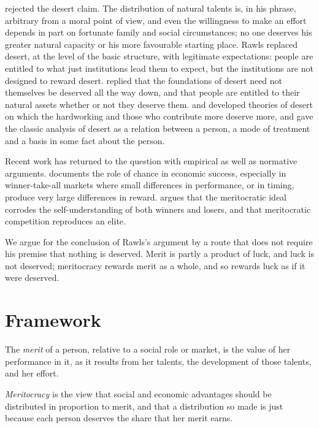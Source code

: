 \documentclass{situationist-preprint}
\begin{document}
\citet[\S\S 17, 48]{Rawls1971} rejected the desert claim. The distribution of natural talents is, in his phrase, arbitrary from a moral point of view, and even the willingness to make an effort depends in part on fortunate family and social circumstances; no one deserves his greater natural capacity or his more favourable starting place. Rawls replaced desert, at the level of the basic structure, with legitimate expectations: people are entitled to what just institutions lead them to expect, but the institutions are not designed to reward desert. \citet[ch.~7]{Nozick1974} replied that the foundations of desert need not themselves be deserved all the way down, and that people are entitled to their natural assets whether or not they deserve them. \citet{Sher1987} and \citet{Miller1999} developed theories of desert on which the hardworking and those who contribute more deserve more, and \citet{Feinberg1970} gave the classic analysis of desert as a relation between a person, a mode of treatment and a basis in some fact about the person.

Recent work has returned to the question with empirical as well as normative arguments. \citet{Frank2016} documents the role of chance in economic success, especially in winner-take-all markets where small differences in performance, or in timing, produce very large differences in reward. \citet{Sandel2020} argues that the meritocratic ideal corrodes the self-understanding of both winners and losers, and \citet{Markovits2019} that meritocratic competition reproduces an elite.

We argue for the conclusion of Rawls's argument by a route that does not require his premise that nothing is deserved. Merit is partly a product of luck, and luck is not deserved; meritocracy rewards merit as a whole, and so rewards luck as if it were deserved.

\section{Framework}

\begin{definition}\label{d:merit}
The \emph{merit} of a person, relative to a social role or market, is the value of her performance in it, as it results from her talents, the development of those talents, and her effort.
\end{definition}

\begin{definition}\label{d:meritocracy}
\emph{Meritocracy} is the view that social and economic advantages should be distributed in proportion to merit, and that a distribution so made is just because each person deserves the share that her merit earns.
\end{definition}
\end{document}
